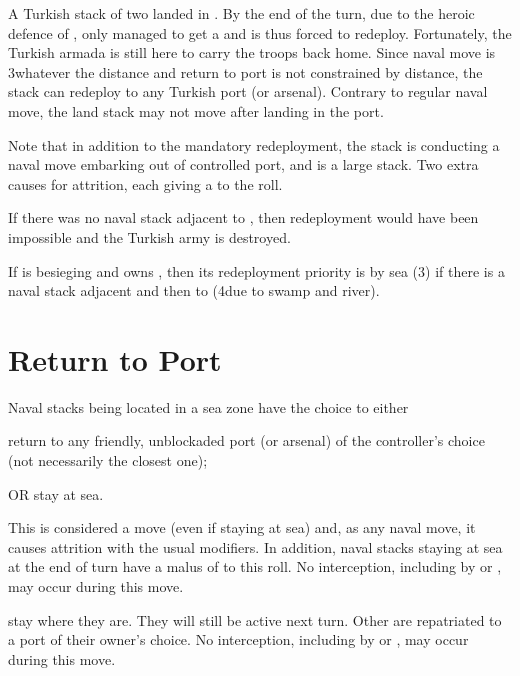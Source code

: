 \begin{exemple}
  A Turkish stack of two \Janissaire \ARMY\Faceplus landed in
  \provinceMalta. By the end of the turn, due to the heroic defence of
  , \TUR only managed to get a \USURE\Facemoins and is thus
  forced to redeploy. Fortunately, the Turkish armada is still here to carry
  the troops back home. Since naval move is 3\MP whatever the distance and
  return to port is not constrained by distance, the stack can redeploy to any
  Turkish port (or arsenal). Contrary to regular naval move, the land stack
  may not move after landing in the port.

  Note that in addition to the mandatory redeployment, the stack is conducting
  a naval move embarking out of controlled port, and is a large stack. Two
  extra causes for attrition, each giving a  to the roll.

  If there was no naval stack adjacent to \provinceMalta, then redeployment
  would have been impossible and the Turkish army is destroyed.

  \smallskip

  If \SUE is besieging \provinceDanzig and owns \provinceHinterpommern, then
  its redeployment priority is by sea (3\MP) if there is a naval stack
  adjacent and then to \provinceHinterpommern (4\MP due to swamp and river).
\end{exemple}

\section{Return to Port}\label{chRedep:Return port}
\aparag[Navies]
\bparag Naval stacks being located in a sea zone have the choice to either
\begin{modlist}
\item return to any friendly, unblockaded port (or arsenal) of the
  controller's choice (not necessarily the closest one);
\item OR stay at sea.
\end{modlist}
\bparag This is considered a move (even if staying at sea) and, as any naval
move, it causes attrition with the usual modifiers.
\bparag In addition, naval stacks staying at sea at the end of turn have a
malus of  to this roll.
\bparag No interception, including by \Presidios or \StraitFort, may occur
during this move.

\bparag {} \corsaire stay where they are. They will still be
active next turn.
\bparag Other \corsaire are repatriated to a port of their owner's choice.
\bparag No interception, including by \Presidios or \StraitFort, may occur
during this move.

